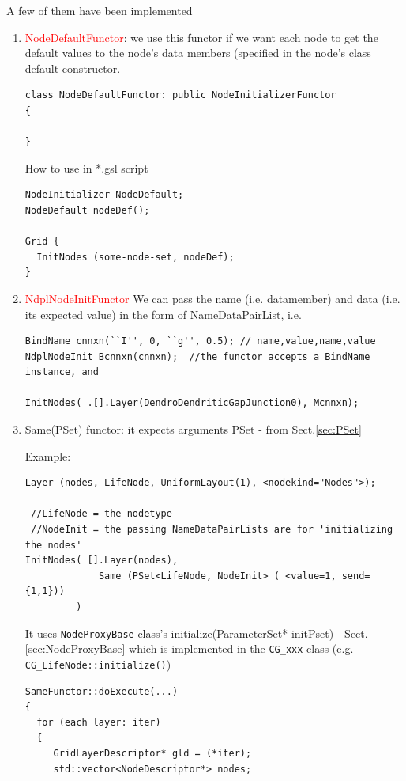 A few of them have been implemented
\begin{enumerate}

   \item \textcolor{red}{NodeDefaultFunctor}: we use this functor if we want
   each node to get the default values to the node's data members (specified in
   the node's class default constructor.

{\tiny
\begin{lstlisting}
class NodeDefaultFunctor: public NodeInitializerFunctor
{

}
\end{lstlisting}
}
How to use in *.gsl script
\begin{verbatim}
NodeInitializer NodeDefault;
NodeDefault nodeDef();

Grid {
  InitNodes (some-node-set, nodeDef);
}
\end{verbatim}
   
   \item \textcolor{red}{NdplNodeInitFunctor}
\label{sec:NdplNodeInitFunctor}
We can pass the name (i.e. datamember) and data (i.e. its expected value) in the
form of NameDataPairList, i.e.

\begin{verbatim}
BindName cnnxn(``I'', 0, ``g'', 0.5); // name,value,name,value
NdplNodeInit Bcnnxn(cnnxn);  //the functor accepts a BindName instance, and

InitNodes( .[].Layer(DendroDendriticGapJunction0), Mcnnxn);
\end{verbatim}

  \item Same(PSet) functor: it expects arguments PSet - from Sect.\ref{sec:PSet}

Example:
\begin{verbatim}
Layer (nodes, LifeNode, UniformLayout(1), <nodekind="Nodes">);

 //LifeNode = the nodetype
 //NodeInit = the passing NameDataPairLists are for 'initializing the nodes'
InitNodes( [].Layer(nodes), 
             Same (PSet<LifeNode, NodeInit> ( <value=1, send={1,1}))
         )
\end{verbatim}  

It uses \verb!NodeProxyBase! class's initialize(ParameterSet* initPset)  -
Sect.\ref{sec:NodeProxyBase} which is implemented in the \verb!CG_xxx! class
(e.g.
\verb!CG_LifeNode::initialize()!)
\begin{verbatim}
SameFunctor::doExecute(...)
{
  for (each layer: iter)
  {
     GridLayerDescriptor* gld = (*iter);
     std::vector<NodeDescriptor*> nodes;
     

\end{verbatim}
\end{enumerate}
